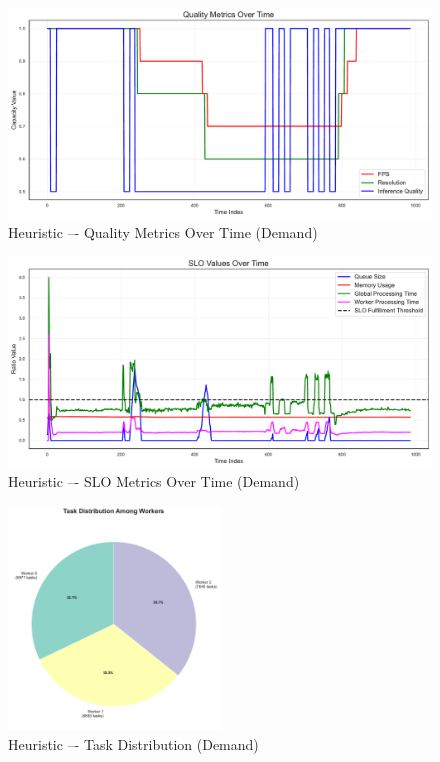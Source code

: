 


\begin{figure}[h]
    \centering
    \includegraphics[width=\textwidth]{img/results/variable_computational_demand/heuristic_quality_metrics.pdf}
    \caption{Heuristic –- Quality Metrics Over Time (Demand)}
\end{figure}
\begin{figure}[h]
    \centering
    \includegraphics[width=\textwidth]{img/results/variable_computational_demand/heuristic_slo_values.pdf}
    \caption{Heuristic –- SLO Metrics Over Time (Demand)}
\end{figure}
\begin{figure}[h]
    \centering
    \includegraphics[width=0.5\textwidth]{img/results/variable_computational_demand/heuristic_task_distribution_pie.pdf}
    \caption{Heuristic –- Task Distribution (Demand)}
\end{figure}

